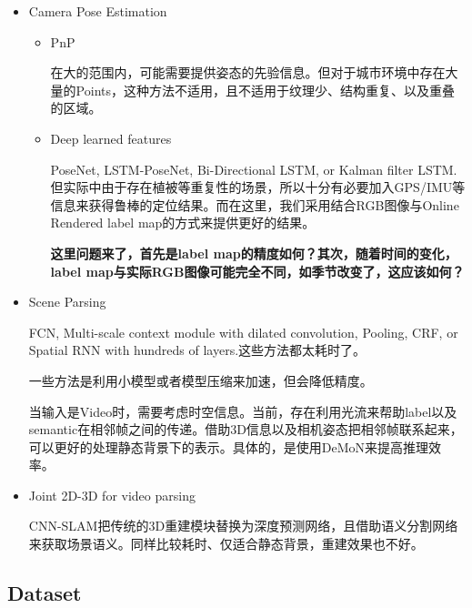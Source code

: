 \begin{itemize}
\item Camera Pose Estimation

\begin{itemize}
\item PnP

在大的范围内，可能需要提供姿态的先验信息。但对于城市环境中存在大量的Points，这种方法不适用，且不适用于纹理少、结构重复、以及重叠的区域。

\item Deep learned features

PoseNet, LSTM-PoseNet, Bi-Directional LSTM, or Kalman filter LSTM.但实际中由于存在植被等重复性的场景，所以十分有必要加入GPS/IMU等信息来获得鲁棒的定位结果。而在这里，我们采用结合RGB图像与Online Rendered label map的方式来提供更好的结果。

{\bfseries \color{red} 这里问题来了，首先是label map的精度如何？其次，随着时间的变化，label map与实际RGB图像可能完全不同，如季节改变了，这应该如何？}

\end{itemize}

\item Scene Parsing

FCN, Multi-scale context module with dilated convolution, Pooling, CRF, or Spatial RNN with hundreds of layers.这些方法都太耗时了。

一些方法是利用小模型或者模型压缩来加速，但会降低精度。

当输入是Video时，需要考虑时空信息。当前，存在利用光流来帮助label以及semantic在相邻帧之间的传递。借助3D信息以及相机姿态把相邻帧联系起来，可以更好的处理静态背景下的表示。具体的，是使用DeMoN来提高推理效率。

\item Joint 2D-3D for video parsing

CNN-SLAM把传统的3D重建模块替换为深度预测网络，且借助语义分割网络来获取场景语义。同样比较耗时、仅适合静态背景，重建效果也不好。

\end{itemize}

\subsection{Dataset}

